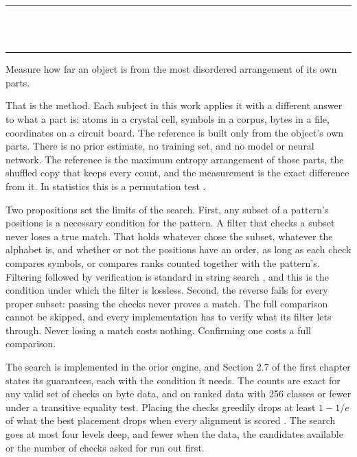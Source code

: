 \thispagestyle{empty}
\begin{center}
  \rule{\textwidth}{0.4pt}\\[0.9em]
  {\Large{}}\\[0.7em]
  \rule{\textwidth}{0.4pt}
\end{center}
\bigskip

\noindent Measure how far an object is from the most disordered arrangement of its own parts.

That is the method. Each subject in this work applies it with a different answer to what a part
is: atoms in a crystal cell, symbols in a corpus, bytes in a file, coordinates on a circuit board.
The reference is built only from the object's own parts. There is no prior estimate, no
training set, and no model or neural network. The reference is the maximum entropy arrangement of
those parts, the shuffled copy that keeps every count, and the measurement is the exact difference
from it. In statistics this is a permutation test \cite{src:Good-2005}.

Two propositions set the limits of the search. First, any subset of a pattern's positions is a
necessary condition for the pattern. A filter that checks a subset never loses a true match. That
holds whatever chose the subset, whatever the alphabet is, and whether or not the positions have an
order, as long as each check compares symbols, or compares ranks counted together with the
pattern's. Filtering followed by verification is standard in string search \cite{src:Navarro}, and
this is the condition under which the filter is lossless. Second, the reverse fails for every proper
subset: passing the checks never proves a match. The full comparison cannot be skipped, and every
implementation has to verify what its filter lets through. Never losing a match costs nothing.
Confirming one costs a full comparison.

The search is implemented in the orior engine, and Section 2.7 of the first chapter states its
guarantees, each with the condition it needs. The
counts are exact for any valid set of checks on byte data, and on ranked data with 256 classes or
fewer under a transitive equality test. Placing the checks greedily drops at least \(1 - 1/e\) of
what the best placement drops when every alignment is scored \cite{src:Nemhauser-Wolsey-and-Fisher}.
The search goes at most four levels deep, and fewer when the data, the candidates available or the
number of checks asked for run out first.

